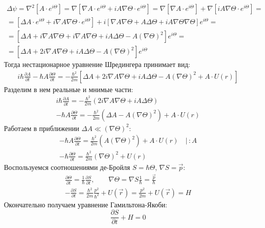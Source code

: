 \begin{gather*}
\Delta\psi=\nabla^2\left[A\cdot e^{i\Theta}\right]=
\nabla\left[\nabla A\cdot e^{i\Theta}+iA\nabla\Theta \cdot e^{i\Theta}\right]=
\nabla\left[
	\nabla A\cdot e^{i\Theta}
	\right]+\nabla\left[
		iA\nabla\Theta \cdot e^{i\Theta}
	\right]=\\=
\left[
	\Delta A \cdot e^{i\Theta}+i\nabla A\nabla\Theta \cdot e^{i\Theta}\right]+
i\left[
	\nabla A\nabla \Theta+A\Delta\Theta+
	iA\nabla \Theta \nabla \Theta
\right]e^{i\Theta}=\\=
\left[
	\Delta A +i\nabla A\nabla\Theta + i\nabla A\nabla \Theta+iA\Delta\Theta - A(\nabla \Theta)^2
\right]e^{i\Theta}=\\=
\left[
	\Delta A +2i\nabla A\nabla\Theta +iA\Delta\Theta - A(\nabla \Theta)^2
\right]e^{i\Theta}
\end{gather*}
Тогда нестационарное уравнение Шредингера принимает вид:
\begin{gather*}
	i\hbar \frac{\partial A}{\partial t}-\hbar A\frac{\partial \Theta}{\partial t}=-\frac{\hbar^2}{2m}\left[
	\Delta A +2i\nabla A\nabla\Theta +iA\Delta\Theta - A(\nabla \Theta)^2+A\cdot U(r)
\right]
\end{gather*}
Разделим в нем реальные и мнимые части:
\begin{gather*}
	i\hbar \frac{\partial A}{\partial t}=-\frac{\hbar^2}{2m}
	(2i\nabla A\nabla\Theta+iA\Delta\Theta)\\
	-\hbar A\frac{\partial \Theta}{\partial t}=-\frac{\hbar^2}{2m}\left(\Delta A - A(\nabla \Theta)^2\right)+A\cdot U(r)
\end{gather*}
Работаем в приближении $\Delta A \ll (\nabla\Theta)^2$:
\begin{gather*}
	-\hbar A\frac{\partial \Theta}{\partial t}=\frac{\hbar^2}{2m}\left(A(\nabla \Theta)^2\right)+A\cdot U(r)\quad \bigg|\,:A\\
	-\hbar \frac{\partial \Theta}{\partial t}=\frac{\hbar^2}{2m}(\nabla \Theta)^2+U(r)
\end{gather*}
Воспользуемся соотношениями де-Бройля $S=\hbar\Theta$, $\nabla S=\vec{p}$:
\begin{gather*}
	\frac{\partial \Theta}{\partial t}=\frac{1}{\hbar}\frac{\partial S}{\partial t}, \qquad
	\nabla\Theta=\nabla S\frac{1}{\hbar}=\frac{\vec{p}}{\hbar}\\
%
	-\frac{\partial S}{\partial t}=\frac{\hbar^2}{2m}\frac{p^2}{\hbar^2}+U(\vec{r})=\frac{p^2}{2m}+U(\vec{r})=H
\end{gather*}
Окончательно получаем уравнение Гамильтона-Якоби:
\begin{equation*}
	\frac{\partial S}{\partial t}+H=0
\end{equation*}

